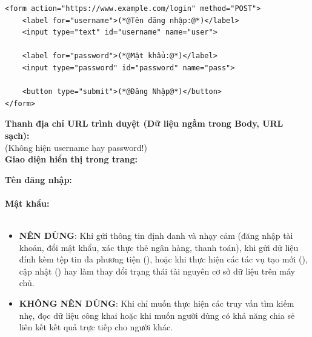 \begin{codeWindow}
\begin{lstlisting}[language=HTML5]
<form action="https://www.example.com/login" method="POST">
    <label for="username">(*@Tên đăng nhập:@*)</label>
    <input type="text" id="username" name="user">
    
    <label for="password">(*@Mật khẩu:@*)</label>
    <input type="password" id="password" name="pass">
    
    <button type="submit">(*@Đăng Nhập@*)</button>
</form>
\end{lstlisting}
\end{codeWindow}

\begin{browserWindow}
\sffamily\small
\textbf{Thanh địa chỉ URL trình duyệt (Dữ liệu ngầm trong Body, URL sạch):} \\[3pt]
 \;\textcolor{codeComment}{(Không hiện username hay password!)} \\[10pt]
\textbf{Giao diện hiển thị trong trang:} \\[4pt]
\begin{tcolorbox}[colback=white, colframe=primaryBlue!20, arc=4pt, boxrule=0.6pt, left=10pt, right=10pt, top=8pt, bottom=8pt]
  \textbf{Tên đăng nhập:} \\[2pt]
  \tcbox[on line, arc=3pt, colback=codeBg, colframe=codeBorder, boxsep=2pt, left=8pt, right=50pt]{\textcolor{darkText}{admin\_user}} \\[6pt]
  \textbf{Mật khẩu:} \\[2pt]
  \tcbox[on line, arc=3pt, colback=codeBg, colframe=codeBorder, boxsep=2pt, left=8pt, right=50pt]{\textcolor{darkText}{$\bullet\bullet\bullet\bullet\bullet\bullet$}} \\[10pt]
\end{tcolorbox}
\end{browserWindow}

\begin{tipBox}
\begin{itemize}[leftmargin=1.5em, itemsep=3pt, parsep=0pt]
    \item \textbf{NÊN DÙNG}: Khi gửi thông tin định danh và nhạy cảm (đăng nhập tài khoản, đổi mật khẩu, xác thực thẻ ngân hàng, thanh toán), khi gửi dữ liệu đính kèm tệp tin đa phương tiện (), hoặc khi thực hiện các tác vụ tạo mới (), cập nhật () hay làm thay đổi trạng thái tài nguyên cơ sở dữ liệu trên máy chủ.
    \item \textbf{KHÔNG NÊN DÙNG}: Khi chỉ muốn thực hiện các truy vấn tìm kiếm nhẹ, đọc dữ liệu công khai hoặc khi muốn người dùng có khả năng chia sẻ liên kết kết quả trực tiếp cho người khác.
\end{itemize}
\end{tipBox}

